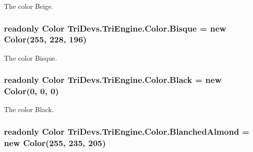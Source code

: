 The color Beige. 

\hypertarget{struct_tri_devs_1_1_tri_engine_1_1_color_a844107e304b4737b0ab05bb300eb8ba3}{
\subsubsection[{Bisque}]{\setlength{\rightskip}{0pt plus 5cm}readonly {\bf Color} Tri\-Devs.\-Tri\-Engine.\-Color.\-Bisque = new {\bf Color}(255, 228, 196)\hspace{0.3cm}{\ttfamily [static]}}}\label{struct_tri_devs_1_1_tri_engine_1_1_color_a844107e304b4737b0ab05bb300eb8ba3}


The color Bisque. 

\hypertarget{struct_tri_devs_1_1_tri_engine_1_1_color_a352957b410f8cc32fd4b63e6b521e230}{
\subsubsection[{Black}]{\setlength{\rightskip}{0pt plus 5cm}readonly {\bf Color} Tri\-Devs.\-Tri\-Engine.\-Color.\-Black = new {\bf Color}(0, 0, 0)\hspace{0.3cm}{\ttfamily [static]}}}\label{struct_tri_devs_1_1_tri_engine_1_1_color_a352957b410f8cc32fd4b63e6b521e230}


The color Black. 

\hypertarget{struct_tri_devs_1_1_tri_engine_1_1_color_ab54f667353fe6bd0bf9b75617457ef34}{
\subsubsection[{Blanched\-Almond}]{\setlength{\rightskip}{0pt plus 5cm}readonly {\bf Color} Tri\-Devs.\-Tri\-Engine.\-Color.\-Blanched\-Almond = new {\bf Color}(255, 235, 205)\hspace{0.3cm}{\ttfamily [static]}}}\label{struct_tri_devs_1_1_tri_engine_1_1_color_ab54f667353fe6bd0bf9b75617457ef34}


